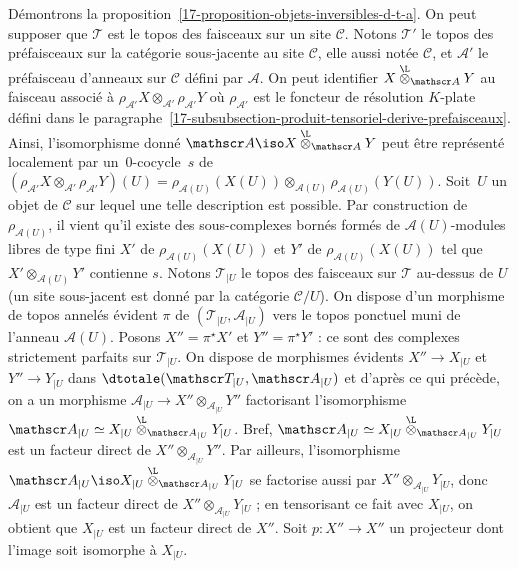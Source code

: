 \documentclass[10pt]{../fichiers-configuration-latex/smfart}
\begin{document}
Démontrons la proposition~\ref{17-proposition-objets-inversibles-d-t-a}. On
peut supposer que $\mathscr T$ est le topos des faisceaux sur un site
$\mathscr C$. Notons $\mathscr T'$ le topos des préfaisceaux sur la
catégorie sous-jacente au site $\mathscr
C$, elle aussi notée $\mathscr C$,
et $\mathscr A'$ le préfaisceau d'anneaux sur $\mathscr C$ défini par
$\mathscr A$. On peut identifier $X\overset{\L}\otimes_{\mathscr A}
Y$ au faisceau associé à $\rho_{\mathscr A'}X\otimes_{\mathscr
A'}\rho_{\mathscr A'}Y$ où $\rho_{\mathscr A'}$ est le foncteur de
résolution $K$-plate défini dans le
paragraphe~\ref{17-subsubsection-produit-tensoriel-derive-prefaisceaux}.
Ainsi, l'isomorphisme donné $\mathscr A\iso
X\overset{\L}\otimes_{\mathscr A}Y$ peut être représenté localement
par un $0$-cocycle $s$ de $(\rho_{\mathscr A'}X\otimes_{\mathscr
A'}\rho_{\mathscr A'}Y)(U)=\rho_{\mathscr A(U)}(X(U))\otimes_{\mathscr
A(U)}\rho_{\mathscr A(U)}(Y(U))$.
Soit $U$ un objet de $\mathscr C$ sur lequel une telle description
est possible. Par construction de $\rho_{\mathscr A(U)}$, il vient qu'il
existe des sous-complexes bornés formés de $\mathscr A(U)$-modules libres de
type fini $X'$ de $\rho_{\mathscr A(U)}(X(U))$ et $Y'$ de $\rho_{\mathscr
A(U)}(X(U))$ tel que $X'\otimes_{\mathscr A(U)} Y'$ contienne $s$. Notons
$\mathscr T_{|U}$ le topos des faisceaux sur $\mathscr T$ au-dessus de $U$
(un site sous-jacent est donné par la catégorie $\mathscr C/U$). On dispose
d'un morphisme de topos annelés évident $\pi$ de $(\mathscr T_{|U},\mathscr
A_{|U})$ vers le topos ponctuel muni de l'anneau $\mathscr A(U)$. Posons
$X''=\pi^\star X'$ et $Y''=\pi^\star Y'$ : ce sont des complexes strictement
parfaits sur $\mathscr T_{|U}$. On dispose de morphismes évidents $X''\to
X_{|U}$ et $Y''\to Y_{|U}$ dans $\dtotale(\mathscr T_{|U},\mathscr A_{|U})$
et d'après ce qui précède, on a un morphisme $\mathscr A_{|U}\to
X''\otimes_{\mathscr A_{|U}} Y''$ factorisant l'isomorphisme $\mathscr
A_{|U}\simeq X_{|U}\overset{\L}\otimes_{\mathscr A_{|U}}Y_{|U}$.
Bref, $\mathscr A_{|U}\simeq X_{|U}
\overset{\L}\otimes_{\mathscr A_{|U}}Y_{|U}$ est un
facteur direct de $X''\otimes_{\mathscr A_{|U}} Y''$. Par ailleurs,
l'isomorphisme $\mathscr A_{|U}\iso X_{|U}
\overset{\L}\otimes_{\mathscr A_{|U}}Y_{|U}$ se factorise aussi par
$X''\otimes_{\mathscr A_{|U}} Y_{|U}$, donc $\mathscr A_{|U}$
est un facteur direct de
$X''\otimes_{\mathscr A_{|U}} Y_{|U}$ ; en tensorisant ce fait avec
$X_{|U}$, on obtient que $X_{|U}$ est un facteur direct de $X''$. Soit
$p\colon X''\to X''$ un projecteur dont l'image soit isomorphe à $X_{|U}$.
\end{document}
